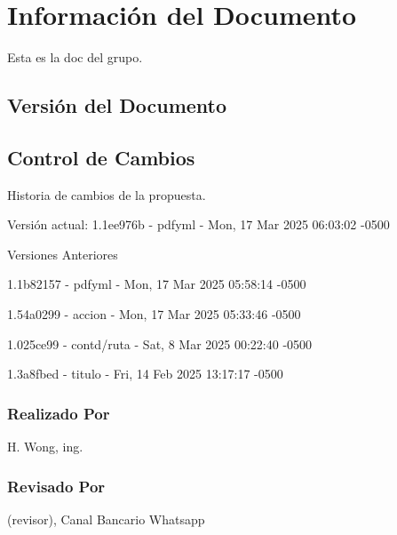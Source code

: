 \documentclass[
  paper=a4,
  ,captions=tableheading
]{scrartcl}
\renewenvironment{quote}{\begin{customblockquote}\list{}{\rightmargin=0em\leftmargin=0em}%
\item\relax\color{blockquote-text}\ignorespaces}{\unskip\unskip\endlist\end{customblockquote}}
\begin{document}



\newpage

\section{Información del
Documento}\label{sec:informaciuxf3n-del-documento}

Esta es la doc del grupo.

\subsection{Versión del Documento}\label{sec:versiuxf3n-del-documento}

\begin{quote}
\end{quote}

\subsection{Control de Cambios}\label{sec:control-de-cambios}

Historia de cambios de la propuesta.

Versión actual: 1.1ee976b - pdfyml - Mon, 17 Mar 2025 06:03:02 -0500

Versiones Anteriores

1.1b82157 - pdfyml - Mon, 17 Mar 2025 05:58:14 -0500

1.54a0299 - accion - Mon, 17 Mar 2025 05:33:46 -0500

1.025ce99 - contd/ruta - Sat, 8 Mar 2025 00:22:40 -0500

1.3a8fbed - titulo - Fri, 14 Feb 2025 13:17:17 -0500

\subsubsection{Realizado Por}\label{sec:realizado-por}

H. Wong, ing.

\subsubsection{Revisado Por}\label{sec:revisado-por}

(revisor), Canal Bancario Whatsapp
\end{document}
